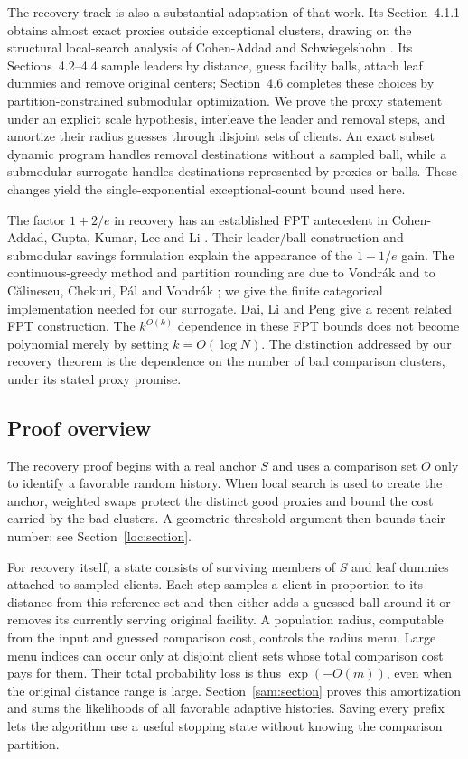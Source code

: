 The recovery track is also a substantial adaptation of that work.
Its Section~4.1.1 obtains almost exact proxies outside exceptional
clusters, drawing on the structural local-search analysis of
Cohen-Addad and Schwiegelshohn \cite{CohenAddadSchwiegelshohn2017}.
Its Sections~4.2--4.4 sample leaders by distance, guess facility balls,
attach leaf dummies and remove original centers; Section~4.6 completes
these choices by partition-constrained submodular optimization.
We prove the proxy statement under an explicit scale hypothesis,
interleave the leader and removal steps, and amortize their radius
guesses through disjoint sets of clients.  An exact subset dynamic
program handles removal destinations without a sampled ball, while a
submodular surrogate handles destinations represented by proxies or
balls.  These changes yield the single-exponential exceptional-count
bound used here.

The factor $1+2/e$ in recovery has an established FPT antecedent in
Cohen-Addad, Gupta, Kumar, Lee and Li \cite{CGKLL2019}.  Their
leader/ball construction and submodular savings formulation explain
the appearance of the $1-1/e$ gain.  The continuous-greedy method and
partition rounding are due to Vondr\'ak and to C\u{a}linescu, Chekuri,
P\'al and Vondr\'ak \cite{Vondrak2008,CCPV2011}; we give the finite
categorical implementation needed for our surrogate.  Dai, Li and
Peng \cite{DaiLiPeng2026} give a recent related FPT construction.
The $k^{O(k)}$ dependence in these FPT bounds does not become polynomial
merely by setting $k=O(\log N)$.  The distinction addressed by our
recovery theorem is the dependence on the number of bad comparison
clusters, under its stated proxy promise.

\subsection{Proof overview}

The recovery proof begins with a real anchor $S$ and uses a comparison
set $O$ only to identify a favorable random history.  When local search
is used to create the anchor, weighted swaps protect the distinct good
proxies and bound the cost carried by the bad clusters.  A geometric
threshold argument then bounds their number; see
Section~\ref{loc:section}.

For recovery itself, a state consists of surviving members of $S$ and
leaf dummies attached to sampled clients.  Each step samples a client
in proportion to its distance from this reference set and then either
adds a guessed ball around it or removes its currently serving original
facility.  A population radius, computable from the input and guessed
comparison cost, controls the radius menu.  Large menu indices can
occur only at disjoint client sets whose total comparison cost pays
for them.  Their total probability loss is thus $\exp(-O(m))$, even
when the original distance range is large.  Section~\ref{sam:section}
proves this amortization and sums the likelihoods of all favorable
adaptive histories.  Saving every prefix lets the algorithm use a
useful stopping state without knowing the comparison partition.


